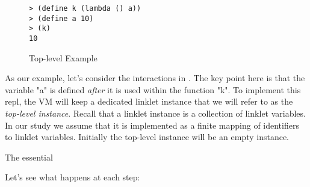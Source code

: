 \begin{wrapfigure}[9]{r}{0.3\textwidth}
  \vspace{-0.6cm}
  \begin{mdframed}
    \begin{verbatim}
> (define k (lambda () a))
> (define a 10)
> (k)
10
\end{verbatim}
    \caption{Top-level Example}
    \label{fig:toplevel-interaction}
  \end{mdframed}
\end{wrapfigure}


As our example, let's consider the interactions in
. The key point here is that the
variable "a" is defined \emph{after} it is used within the function
"k". To implement this repl, the VM will keep a dedicated linklet
instance that we will refer to as the \emph{top-level
  instance}. Recall that a linklet instance is a collection of linklet
variables. In our study we assume that it is implemented as a finite
mapping of identifiers to linklet variables. Initially the top-level
instance will be an empty instance.

The essential 


Let's see what happens at each step:

